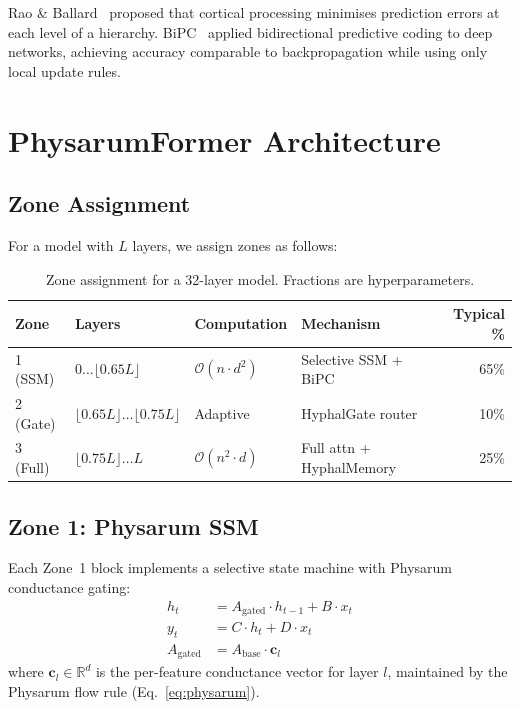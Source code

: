 \documentclass[11pt]{article}
\begin{document}
Rao \& Ballard~\cite{rao1999} proposed that cortical processing minimises prediction errors at each level of a hierarchy. BiPC~\cite{bipc2025} applied bidirectional predictive coding to deep networks, achieving accuracy comparable to backpropagation while using only local update rules.

\section{PhysarumFormer Architecture}
\label{sec:arch}

\subsection{Zone Assignment}

For a model with $L$ layers, we assign zones as follows:

\begin{table}[h]
\centering
\begin{tabular}{llllr}
\toprule
Zone & Layers & Computation & Mechanism & Typical \% \\
\midrule
1 (SSM)  & $0 \ldots \lfloor 0.65L \rfloor$ & $\mathcal{O}(n \cdot d^2)$ & Selective SSM + BiPC & 65\% \\
2 (Gate) & $\lfloor 0.65L \rfloor \ldots \lfloor 0.75L \rfloor$ & Adaptive & HyphalGate router & 10\% \\
3 (Full) & $\lfloor 0.75L \rfloor \ldots L$ & $\mathcal{O}(n^2 \cdot d)$ & Full attn + HyphalMemory & 25\% \\
\bottomrule
\end{tabular}
\caption{Zone assignment for a 32-layer model. Fractions are hyperparameters.}
\label{tab:zones}
\end{table}

\subsection{Zone 1: Physarum SSM}

Each Zone~1 block implements a selective state machine with Physarum conductance gating:
\begin{align}
  h_t &= A_\text{gated} \cdot h_{t-1} + B \cdot x_t \label{eq:ssm_state}\\
  y_t &= C \cdot h_t + D \cdot x_t \label{eq:ssm_out}\\
  A_\text{gated} &= A_\text{base} \cdot \mathbf{c}_l \label{eq:physarum_gate}
\end{align}
where $\mathbf{c}_l \in \mathbb{R}^d$ is the per-feature conductance vector for layer $l$, maintained by the Physarum flow rule (Eq.~\ref{eq:physarum}).
\end{document}
